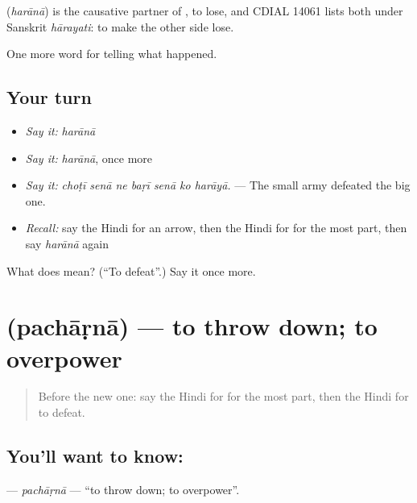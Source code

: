 \begin{cousinweb}
\textbf{} (\emph{harānā}) is the causative partner of \textbf{}, to lose, and CDIAL 14061 lists both under Sanskrit \emph{hārayati}: to make the other side lose.
\end{cousinweb}

\begin{grammarlens}[title={What you've built}]
One more word for telling what happened.
\end{grammarlens}

\subsection*{Your turn}
\begin{itemize}
\raggedright
  \item \emph{Say it:} \emph{harānā}
  \item \emph{Say it:} \emph{harānā}, once more
  \item \emph{Say it:} \emph{choṭī senā ne baṛī senā ko harāyā.} — The small army defeated the big one.
  \item \emph{Recall:} say the Hindi for an arrow, then the Hindi for for the most part, then say \emph{harānā} again
\end{itemize}

\begin{tcolorbox}[breakable,colback=teal!4,colframe=teal!35!black,title={Before you move on}]
What does  mean? (\textquotedblleft{}To defeat\textquotedblright{}.) Say it once more.
\end{tcolorbox}
\section[\texorpdfstring{\hi{पछाड़ना} (pachāṛnā)}{पछाड़ना (pachāṛnā)}]{ (pachāṛnā) — to throw down; to overpower}

\label{lesson:HI-C323-pacharna}



\begin{quote}
Before the new one: say the Hindi for for the most part, then the Hindi for to defeat.
\end{quote}

\subsection*{You'll want to know: }
\textbf{} — \emph{pachāṛnā} — \textquotedblleft{}to throw down; to overpower\textquotedblright{}.


